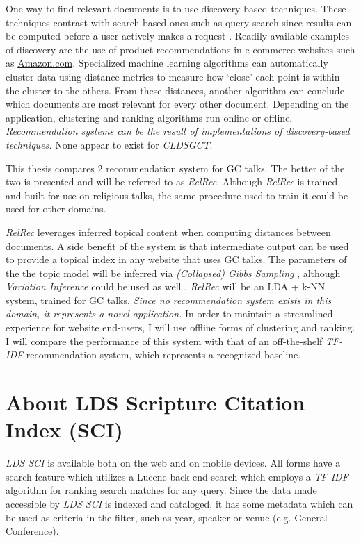 One way to find relevant documents is to use discovery-based techniques. These techniques contrast with search-based ones such as query search since results can be computed before a user actively makes a request \citep{todo}. Readily available examples of discovery are the use of product recommendations in e-commerce websites such as \url{Amazon.com}. Specialized machine learning algorithms can automatically cluster data using distance metrics to measure how `close' each point is within the cluster to the others. From these distances, another algorithm can conclude which documents are most relevant for every other document. Depending on the application, clustering and ranking algorithms run online or offline. \textit{Recommendation systems can be the result of implementations of discovery-based techniques.} None appear to exist for \emph{CLDSGCT}.

This thesis compares 2 recommendation system for GC talks. The better of the two is presented and will be referred to as \emph{RelRec}. Although \emph{RelRec} is trained and built for use on religious talks, the same procedure used to train it could be used for other domains.

\emph{RelRec} leverages inferred topical content when computing distances between documents. A side benefit of the system is that intermediate output can be used to provide a topical index in any website that uses GC talks. The parameters of the the topic model will be inferred via \emph{(Collapsed) Gibbs Sampling} \citep{Porteous:2008:FCG:1401890.1401960}, although \emph{Variation Inference} could be used as well \citep{blei2006variational}. \emph{RelRec} will be an LDA + k-NN system, trained for GC talks. \textit{Since no recommendation system exists in this domain, it represents a novel application.} In order to maintain a streamlined experience for website end-users, I will use offline forms of clustering and ranking. I will compare the performance of this system with that of an off-the-shelf \emph{TF-IDF} recommendation system, which represents a recognized baseline.


\section{About LDS Scripture Citation Index (SCI)}
\emph{LDS SCI} is available both on the web and on mobile devices. All forms have a search feature which utilizes a Lucene \citep{lucene:luke} back-end search which employs a \emph{TF-IDF} algorithm for ranking search matches for any query. Since the data made accessible by \emph{LDS SCI} is indexed and cataloged, it has some metadata which can be used as criteria in the filter, such as year, speaker or venue (e.g. General Conference).

